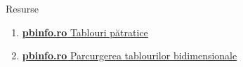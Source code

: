 \documentclass{beamer}
\begin{document}
\begin{frame}{Resurse}
  \begin{enumerate}
    \item \href{https://www.pbinfo.ro/articole/5626/tablouri-patratice}{\textbf{pbinfo.ro} \textemdash{} Tablouri pătratice}
    \item \href{https://www.pbinfo.ro/articole/5623/parcurgerea-tablourilor-bidimensionale}{\textbf{pbinfo.ro} \textemdash{} Parcurgerea tablourilor bidimensionale}
  \end{enumerate}
\end{frame}
\end{document}
